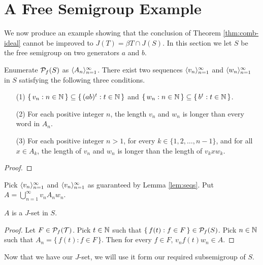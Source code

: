 \section{A Free Semigroup Example}
\label{sec:example}

We now produce an example showing that the conclusion of Theorem \ref{thm:comb-ideal} cannot be improved to $J(T) = \beta T \cap J(S)$.
In this section we let $S$ be the free semigroup on two generators $a$ and $b$.

\begin{lem}
  \label{lem:seqs}
  Enumerate $\mathcal{P}_f(S)$ as $\langle A_n \rangle_{n=1}^\infty$.
  There exist two sequences $\langle v_n \rangle_{n=1}^\infty$ and $\langle w_n \rangle_{n=1}^\infty$ in $S$ satisfying the following three conditions.
  \begin{itemize}
    \item[(1)]
      $\{\, v_n : n \in \mathbb{N} \,\} \subseteq \{\, (ab)^t : t \in \mathbb{N} \,\}$ and $\{\, w_n : n \in \mathbb{N} \,\} \subseteq \{\, b^t : t \in \mathbb{N} \,\}$.

    \item[(2)]
      For each positive integer $n$, the length $v_n$ and $w_n$ is longer than every word in $A_n$.

    \item[(3)]
      For each positive integer $n > 1$, for every $k \in \{1, 2, \ldots, n-1\}$, and for all $x \in A_k$, the length of $v_n$ and $w_n$ is longer than the length of $v_kxw_k$.
  \end{itemize}
\end{lem}
\begin{proof}
\end{proof}

\begin{defn}
  Pick $\langle v_n \rangle_{n=1}^\infty$ and $\langle v_n \rangle_{n=1}^\infty$ as guaranteed by Lemma \ref{lem:seqs}.
  Put $A = \bigcup_{n=1}^\infty v_nA_nw_n$.
\end{defn}

\begin{lem}
  $A$ is a $J$-set in $S$. 
\end{lem}
\begin{proof}
  Let $F \in \mathcal{P}_f(\mathcal{T})$.
  Pick $t \in \mathbb{N}$ such that $\{\, f(t) : f \in F\,\} \in \mathcal{P}_f(S)$.
  Pick $n \in \mathbb{N}$ such that $A_n = \{\, f(t) : f \in F\,\}$. 
  Then for every $f \in F$, $v_nf(t)w_n \in A$. 
\end{proof}

Now that we have our $J$-set, we will use it form our required subsemigroup of $S$.

